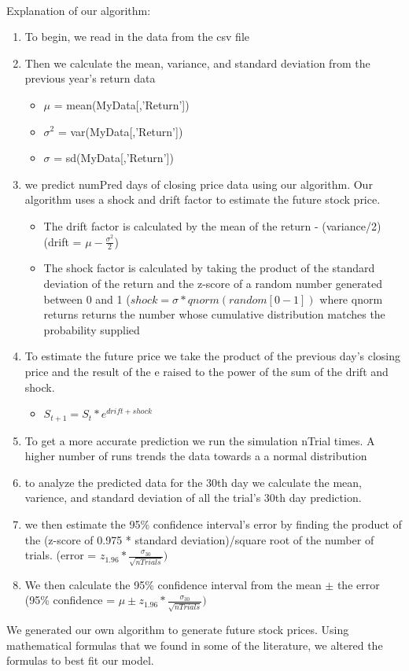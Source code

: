 \documentclass{article}
\begin{document}
\\
Explanation of our algorithm:
\begin{enumerate}
\item To begin, we read in the data from the csv file
\item Then we calculate the mean, variance, and standard deviation from the previous year's return data
\begin{itemize}
\item $\mu$ = mean(MyData[,'Return'])
\item $\sigma^2$ = var(MyData[,'Return'])
\item $\sigma$ = sd(MyData[,'Return'])
\end{itemize}
\item we predict numPred days of closing price data using our algorithm. Our algorithm uses a shock and drift factor to estimate the future stock price.
\begin{itemize}
\item  The drift factor is calculated by the mean of the return - (variance/2)
(drift = $\mu - \frac{\sigma^2}{2}$)
\item The shock factor is calculated by taking the product of the standard deviation of the return and the z-score of a random number generated between 0 and 1 ($shock = \sigma*qnorm(random[0-1])$ where qnorm returns returns the number whose cumulative distribution matches the probability supplied 
\end{itemize}
\item To estimate the future price we take the product of the previous day's closing price and the result of the e raised to the power of the sum of the drift and shock. 
\begin{itemize}
\item $S_{t+1} = S_t*e^{drift + shock}$
\end{itemize}
\item To get a more accurate prediction we run the simulation nTrial times. A higher number of runs trends the data towards a a normal distribution
\item to analyze the predicted data for the 30th day we calculate the mean, varience, and standard deviation of all the trial's 30th day prediction.
\item we then estimate the 95\% confidence interval's error by finding the product of the (z-score of 0.975 * standard deviation)/square root of the number of trials. (error = $z_{1.96}*\frac{\sigma_{30}}{\sqrt{nTrials}})$
\item We then calculate the 95\% confidence interval from the mean $\pm$ the error (95\% confidence = $\mu \pm z_{1.96}*\frac{\sigma_{30}}{\sqrt{nTrials}})$
\end{enumerate}
\text We generated our own algorithm to generate future stock prices. Using mathematical formulas that we found in some of the literature, we altered the formulas to best fit our model. 
\end{document}
